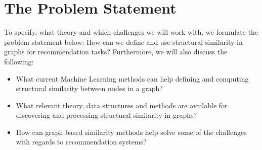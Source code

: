 \section{The Problem Statement}
  To specify, what theory and which challenges we will work with, we formulate the problem statement below:
  How can we define and use structural similarity in graphs for recommendation tasks?
  Furthermore, we will also discuss the following:
  \begin{itemize}
    \item What current Machine Learning methods can help defining and computing structural similarity between nodes in a graph?
    \item What  relevant theory, data structures and methods are available for discovering and processing structural similarity in graphs?
    \item How can graph based similarity methods help solve some of the challenges with regards to recommendation systems?
  \end{itemize}
